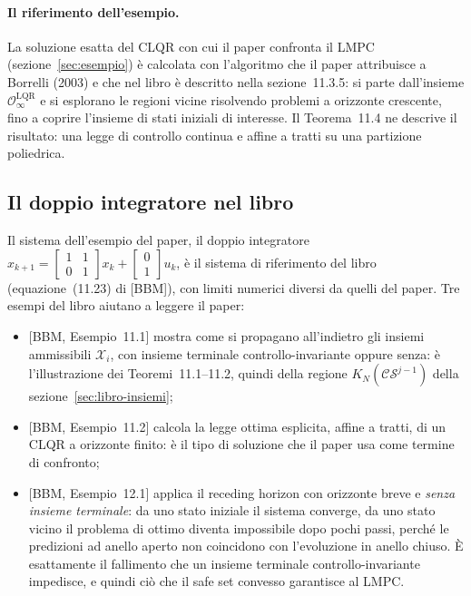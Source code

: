 \documentclass[11pt,a4paper]{article}
\theoremstyle{definition}
\theoremstyle{plain}
\theoremstyle{remark}
\newcommand{\Xc}{\mathcal{X}}
\newcommand{\CS}{\mathcal{CS}}
\newcommand{\libro}[1]{\textup{[BBM, #1]}} %
\begin{document}
\paragraph{Il riferimento dell'esempio.}
La soluzione esatta del CLQR con cui il paper confronta il LMPC
(sezione~\ref{sec:esempio}) è calcolata con l'algoritmo che il paper attribuisce
a Borrelli (2003) e che nel libro è descritto nella sezione~11.3.5: si parte
dall'insieme $\mathcal{O}^{\mathrm{LQR}}_\infty$ e si esplorano le regioni
vicine risolvendo problemi a orizzonte crescente, fino a coprire l'insieme di
stati iniziali di interesse. Il Teorema~11.4 ne descrive il risultato: una
legge di controllo continua e affine a tratti su una partizione poliedrica.

\subsection{Il doppio integratore nel libro}\label{sec:libro-esempio}

Il sistema dell'esempio del paper, il doppio integratore
$x_{k+1}=\left[\begin{smallmatrix}1&1\\0&1\end{smallmatrix}\right]x_k+
\left[\begin{smallmatrix}0\\1\end{smallmatrix}\right]u_k$, è il sistema di
riferimento del libro (equazione~(11.23) di [BBM]), con limiti numerici
diversi da quelli del paper. Tre esempi del libro aiutano a leggere il paper:
\begin{itemize}
  \item \libro{Esempio~11.1} mostra come si propagano all'indietro gli insiemi
        ammissibili $\Xc_i$, con insieme terminale controllo-invariante oppure
        senza: è l'illustrazione dei Teoremi~11.1--11.2, quindi della
        regione $K_N(\CS^{j-1})$ della sezione~\ref{sec:libro-insiemi};
  \item \libro{Esempio~11.2} calcola la legge ottima esplicita, affine a
        tratti, di un CLQR a orizzonte finito: è il tipo di soluzione che il
        paper usa come termine di confronto;
  \item \libro{Esempio~12.1} applica il receding horizon con orizzonte breve e
        \emph{senza insieme terminale}: da uno stato iniziale il sistema
        converge, da uno stato vicino il problema di ottimo diventa
        impossibile dopo pochi passi, perché le predizioni ad anello aperto
        non coincidono con l'evoluzione in anello chiuso. È esattamente il
        fallimento che un insieme terminale controllo-invariante impedisce,
        e quindi ciò che il safe set convesso garantisce al LMPC.
\end{itemize}
\end{document}
